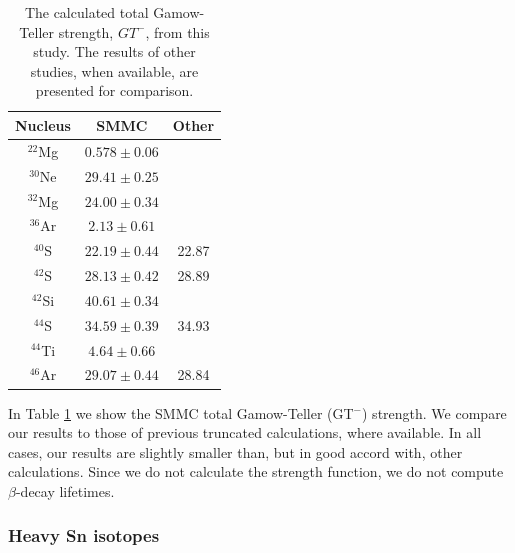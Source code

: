 \begin{table}%
\begin{center}
\caption{The calculated total Gamow-Teller strength, $GT^-$,
from this study.  The results of other studies, when
available, are presented for comparison.
}
\renewcommand{\arraystretch}{1.2}
\begin{tabular}{|ccc|}\hline
 Nucleus & SMMC & Other \\
\hline
 $^{22}$Mg & $0.578 \pm  0.06$  & \\
 $^{30}$Ne & $29.41 \pm 0.25$ & \\
 $^{32}$Mg & $24.00 \pm 0.34$ & \\
 $^{36}$Ar & $2.13 \pm  0.61$ & \\
 $^{40}$S  & $22.19 \pm 0.44$ & 22.87 \cite{Morten:r:retamosa} \\
 $^{42}$S  & $28.13 \pm 0.42$ & 28.89 \cite{Morten:r:retamosa} \\
 $^{42}$Si & $40.61 \pm 0.34$ & \\
 $^{44}$S  & $34.59 \pm 0.39$ & 34.93 \cite{Morten:r:retamosa} \\
 $^{44}$Ti & $4.64 \pm  0.66$ & \\
 $^{46}$Ar & $29.07 \pm 0.44$ & 28.84 \cite{Morten:r:retamosa} \\\hline
\end{tabular}
\end{center}
\label{Morten:t:tab4}
\end{table}
In Table \ref{Morten:t:tab4} we show the SMMC total Gamow-Teller (GT$^-$)
strength.  We compare our results to those of previous truncated
calculations, where available.  In all cases, our results are slightly
smaller than, but in good accord with, other calculations.  Since we
do not calculate the strength function, we do not compute
$\beta$-decay lifetimes.



\subsubsection{Heavy Sn isotopes}

